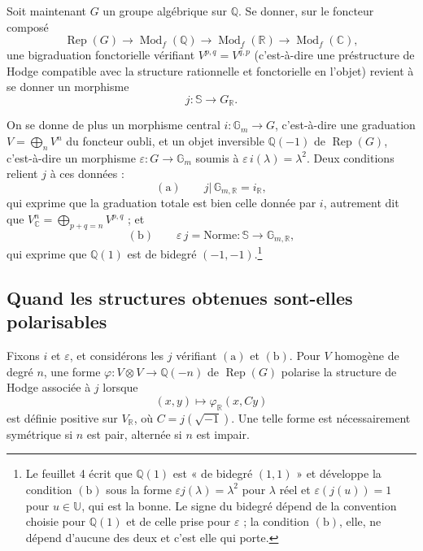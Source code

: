\documentclass[11pt,a4paper]{article}
\begin{document}
Soit maintenant $G$ un groupe algébrique sur $\mathbb{Q}$. Se donner, sur le
foncteur composé
\[
\operatorname{Rep}(G) \longrightarrow \operatorname{Mod}_{f}(\mathbb{Q})
\longrightarrow \operatorname{Mod}_{f}(\mathbb{R})
\longrightarrow \operatorname{Mod}_{f}(\mathbb{C}) ,
\]
une bigraduation fonctorielle vérifiant $V^{p,q} = \overline{V^{q,p}}$
(c'est-à-dire une préstructure de Hodge compatible avec la structure rationnelle
et fonctorielle en l'objet) revient à se donner un morphisme
\[
j : \mathbb{S} \longrightarrow G_{\mathbb{R}} .
\]

On se donne de plus un morphisme central $i : \mathbb{G}_{m} \to G$, c'est-à-dire
une graduation $V = \bigoplus_{n} V^{n}$ du foncteur oubli, et un objet
inversible $\mathbb{Q}(-1)$ de $\operatorname{Rep}(G)$, c'est-à-dire un morphisme
$\varepsilon : G \to \mathbb{G}_{m}$ soumis à $\varepsilon\, i(\lambda) =
\lambda^{2}$. Deux conditions relient $j$ à ces données :
\[
(\mathrm{a}) \qquad j\big|\,\mathbb{G}_{m,\mathbb{R}} = i_{\mathbb{R}} ,
\]
qui exprime que la graduation totale est bien celle donnée par $i$, autrement dit
que $V^{n}_{\mathbb{C}} = \bigoplus_{p+q=n} V^{p,q}$ ; et
\[
(\mathrm{b}) \qquad \varepsilon\, j = \text{Norme} : \mathbb{S} \longrightarrow \mathbb{G}_{m,\mathbb{R}} ,
\]
qui exprime que $\mathbb{Q}(1)$ est de bidegré $(-1,-1)$.\footnote{Le feuillet 4
écrit que $\mathbb{Q}(1)$ est « de bidegré $(1,1)$ » et développe la condition
$(\mathrm{b})$ sous la forme $\varepsilon j(\lambda) = \lambda^{2}$ pour
$\lambda$ réel et $\varepsilon(j(u)) = 1$ pour $u \in \mathbb{U}$, qui est la
bonne. Le signe du bidegré dépend de la convention choisie pour $\mathbb{Q}(1)$
et de celle prise pour $\varepsilon$ ; la condition $(\mathrm{b})$, elle, ne
dépend d'aucune des deux et c'est elle qui porte.}

\subsection*{Quand les structures obtenues sont-elles polarisables}

Fixons $i$ et $\varepsilon$, et considérons les $j$ vérifiant $(\mathrm{a})$ et
$(\mathrm{b})$. Pour $V$ homogène de degré $n$, une forme
$\varphi : V \otimes V \to \mathbb{Q}(-n)$ de $\operatorname{Rep}(G)$ polarise la
structure de Hodge associée à $j$ lorsque
\[
(x,y) \longmapsto \varphi_{\mathbb{R}}(x, Cy)
\]
est définie positive sur $V_{\mathbb{R}}$, où $C = j(\sqrt{-1})$. Une telle forme
est nécessairement symétrique si $n$ est pair, alternée si $n$ est impair.
\end{document}
